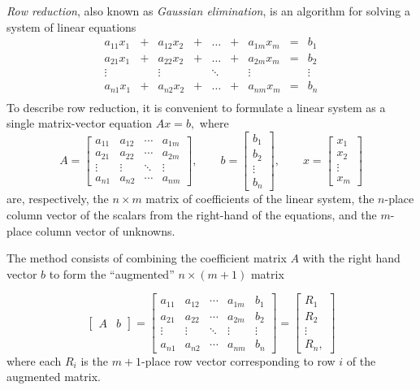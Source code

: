 \documentclass{article}
\begin{document}
\emph{Row reduction}, also known as \emph{Gaussian elimination}, is an algorithm for solving a system of linear equations
\[
\begin{array}{ccccccccl}
a_{11} x_1 &+ &a_{12} x_2 &+ &\ldots &+ &a_{1m} x_m &=& b_1 \\
a_{21} x_1 &+ &a_{22} x_2 &+ &\ldots &+ &a_{2m} x_m &=& b_2 \\
\vdots & & \vdots & & \ddots && \vdots && \vdots\\
a_{n1} x_1 &+ &a_{n2} x_2 &+ &\ldots &+ &a_{nm} x_m &=& b_n \\
\end{array}
\]
To describe row reduction, it is convenient to formulate a linear
system as a single matrix-vector equation $Ax = b,$ where
\[
A = \begin{bmatrix}
a_{11} & a_{12} & \cdots & a_{1m} \\
a_{21} & a_{22} & \cdots & a_{2m} \\
\vdots & \vdots & \ddots & \vdots \\
a_{n1} & a_{n2} & \cdots & a_{nm}
\end{bmatrix}, \qquad
b = \begin{bmatrix}
b_1 \\ b_2 \\ \vdots \\ b_n
\end{bmatrix},  \qquad
x = \begin{bmatrix}
x_1 \\ x_2 \\ \vdots \\ x_m
\end{bmatrix}
\]
are, respectively, the $n\times m$ matrix of coefficients of the
linear system, the $n$-place column vector of the scalars from the
right-hand of the equations, and the $m$-place column vector of
unknowns.

The method consists of combining the coefficient matrix $A$ with the
right hand vector $b$ to form the ``augmented'' $n \times (m + 1)$ matrix

$$ \begin{bmatrix} A & b \end{bmatrix} =
\begin{bmatrix}
a_{11} & a_{12} & \cdots & a_{1m} & b_1 \\
a_{21} & a_{22} & \cdots & a_{2m} & b_2 \\
\vdots & \vdots & \ddots & \vdots & \vdots \\
a_{n1} & a_{n2} & \cdots & a_{nm} & b_n
\end{bmatrix} =
\begin{bmatrix}
  R_1 \\ R_2 \\ \vdots \\ R_n,
\end{bmatrix}
$$
where each $R_i$ is the $m+1$-place row vector corresponding to row
$i$ of the augmented matrix.
\end{document}
